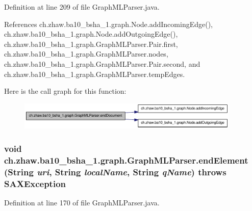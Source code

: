 Definition at line 209 of file GraphMLParser.java.

References ch.zhaw.ba10\_\-bsha\_\-1.graph.Node.addIncomingEdge(), ch.zhaw.ba10\_\-bsha\_\-1.graph.Node.addOutgoingEdge(), ch.zhaw.ba10\_\-bsha\_\-1.graph.GraphMLParser.Pair.first, ch.zhaw.ba10\_\-bsha\_\-1.graph.GraphMLParser.nodes, ch.zhaw.ba10\_\-bsha\_\-1.graph.GraphMLParser.Pair.second, and ch.zhaw.ba10\_\-bsha\_\-1.graph.GraphMLParser.tempEdges.

Here is the call graph for this function:\nopagebreak
\begin{figure}[H]
\begin{center}
\leavevmode
\includegraphics[width=300pt]{classch_1_1zhaw_1_1ba10__bsha__1_1_1graph_1_1GraphMLParser_a644cce55a39c7d1acb1625b7903a6522_cgraph}
\end{center}
\end{figure}
\hypertarget{classch_1_1zhaw_1_1ba10__bsha__1_1_1graph_1_1GraphMLParser_a3121ca1de0dbf5cc9e7d262608f55f52}{
\subsubsection[{endElement}]{\setlength{\rightskip}{0pt plus 5cm}void ch.zhaw.ba10\_\-bsha\_\-1.graph.GraphMLParser.endElement (String {\em uri}, \/  String {\em localName}, \/  String {\em qName})  throws SAXException }}
\label{classch_1_1zhaw_1_1ba10__bsha__1_1_1graph_1_1GraphMLParser_a3121ca1de0dbf5cc9e7d262608f55f52}


Definition at line 170 of file GraphMLParser.java.

